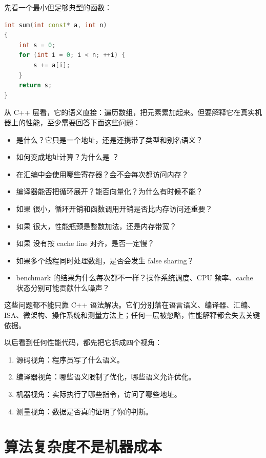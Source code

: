 先看一个最小但足够典型的函数：

\begin{lstlisting}[language=C++]
int sum(int const* a, int n)
{
    int s = 0;
    for (int i = 0; i < n; ++i) {
        s += a[i];
    }
    return s;
}
\end{lstlisting}

从 C++ 层看，它的语义直接：遍历数组，把元素累加起来。但要解释它在真实机器上的性能，至少需要回答下面这些问题：

\begin{itemize}
  \item {} 是什么？它只是一个地址，还是还携带了类型和别名语义？
  \item {} 如何变成地址计算？为什么是 ？
  \item {} 在汇编中会使用哪些寄存器？会不会每次都访问内存？
  \item 编译器能否把循环展开？能否向量化？为什么有时候不能？
  \item 如果  很小，循环开销和函数调用开销是否比内存访问还重要？
  \item 如果  很大，性能瓶颈是整数加法，还是内存带宽？
  \item 如果  没有按 cache line 对齐，是否一定慢？
  \item 如果多个线程同时处理数组，是否会发生 false sharing？
  \item benchmark 的结果为什么每次都不一样？操作系统调度、CPU 频率、cache 状态分别可能贡献什么噪声？
\end{itemize}

这些问题都不能只靠 C++ 语法解决。它们分别落在语言语义、编译器、汇编、ISA、微架构、操作系统和测量方法上；任何一层被忽略，性能解释都会失去关键依据。

\begin{mentalmodel}
以后看到任何性能代码，都先把它拆成四个视角：

\begin{enumerate}
  \item 源码视角：程序员写了什么语义。
  \item 编译器视角：哪些语义限制了优化，哪些语义允许优化。
  \item 机器视角：实际执行了哪些指令，访问了哪些地址。
  \item 测量视角：数据是否真的证明了你的判断。
\end{enumerate}
\end{mentalmodel}

\section{算法复杂度不是机器成本}

